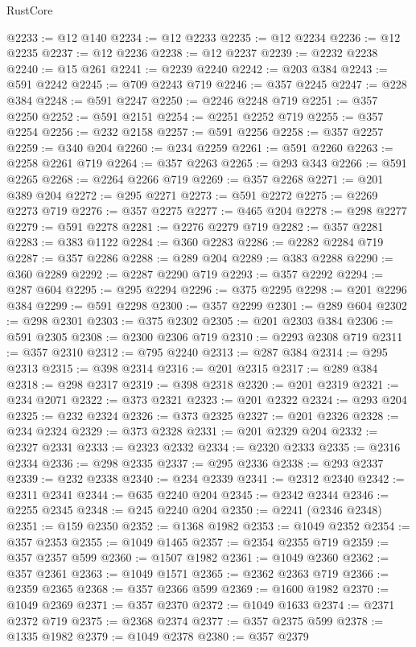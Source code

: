 \begin{lexlean}{RustCore}
\begin{coremodule}
@2233 := @12 @140
@2234 := @12 @2233
@2235 := @12 @2234
@2236 := @12 @2235
@2237 := @12 @2236
@2238 := @12 @2237
@2239 := @2232 @2238
@2240 := @15 @261
@2241 := @2239 @2240
@2242 := @203 @384
@2243 := @591 @2242
@2245 := @709 @2243 @719
@2246 := @357 @2245
@2247 := @228 @384
@2248 := @591 @2247
@2250 := @2246 @2248 @719
@2251 := @357 @2250
@2252 := @591 @2151
@2254 := @2251 @2252 @719
@2255 := @357 @2254
@2256 := @232 @2158
@2257 := @591 @2256
@2258 := @357 @2257
@2259 := @340 @204
@2260 := @234 @2259
@2261 := @591 @2260
@2263 := @2258 @2261 @719
@2264 := @357 @2263
@2265 := @293 @343
@2266 := @591 @2265
@2268 := @2264 @2266 @719
@2269 := @357 @2268
@2271 := @201 @389 @204
@2272 := @295 @2271
@2273 := @591 @2272
@2275 := @2269 @2273 @719
@2276 := @357 @2275
@2277 := @465 @204
@2278 := @298 @2277
@2279 := @591 @2278
@2281 := @2276 @2279 @719
@2282 := @357 @2281
@2283 := @383 @1122
@2284 := @360 @2283
@2286 := @2282 @2284 @719
@2287 := @357 @2286
@2288 := @289 @204
@2289 := @383 @2288
@2290 := @360 @2289
@2292 := @2287 @2290 @719
@2293 := @357 @2292
@2294 := @287 @604
@2295 := @295 @2294
@2296 := @375 @2295
@2298 := @201 @2296 @384
@2299 := @591 @2298
@2300 := @357 @2299
@2301 := @289 @604
@2302 := @298 @2301
@2303 := @375 @2302
@2305 := @201 @2303 @384
@2306 := @591 @2305
@2308 := @2300 @2306 @719
@2310 := @2293 @2308 @719
@2311 := @357 @2310
@2312 := @795 @2240
@2313 := @287 @384
@2314 := @295 @2313
@2315 := @398 @2314
@2316 := @201 @2315
@2317 := @289 @384
@2318 := @298 @2317
@2319 := @398 @2318
@2320 := @201 @2319
@2321 := @234 @2071
@2322 := @373 @2321
@2323 := @201 @2322
@2324 := @293 @204
@2325 := @232 @2324
@2326 := @373 @2325
@2327 := @201 @2326
@2328 := @234 @2324
@2329 := @373 @2328
@2331 := @201 @2329 @204
@2332 := @2327 @2331
@2333 := @2323 @2332
@2334 := @2320 @2333
@2335 := @2316 @2334
@2336 := @298 @2335
@2337 := @295 @2336
@2338 := @293 @2337
@2339 := @232 @2338
@2340 := @234 @2339
@2341 := @2312 @2340
@2342 := @2311 @2341
@2344 := @635 @2240 @204
@2345 := @2342 @2344
@2346 := @2255 @2345
@2348 := @245 @2240 @204
@2350 := @2241 (@2346 @2348)
@2351 := @159 @2350
@2352 := @1368 @1982
@2353 := @1049 @2352
@2354 := @357 @2353
@2355 := @1049 @1465
@2357 := @2354 @2355 @719
@2359 := @357 @2357 @599
@2360 := @1507 @1982
@2361 := @1049 @2360
@2362 := @357 @2361
@2363 := @1049 @1571
@2365 := @2362 @2363 @719
@2366 := @2359 @2365
@2368 := @357 @2366 @599
@2369 := @1600 @1982
@2370 := @1049 @2369
@2371 := @357 @2370
@2372 := @1049 @1633
@2374 := @2371 @2372 @719
@2375 := @2368 @2374
@2377 := @357 @2375 @599
@2378 := @1335 @1982
@2379 := @1049 @2378
@2380 := @357 @2379

\end{coremodule}
\end{lexlean}
